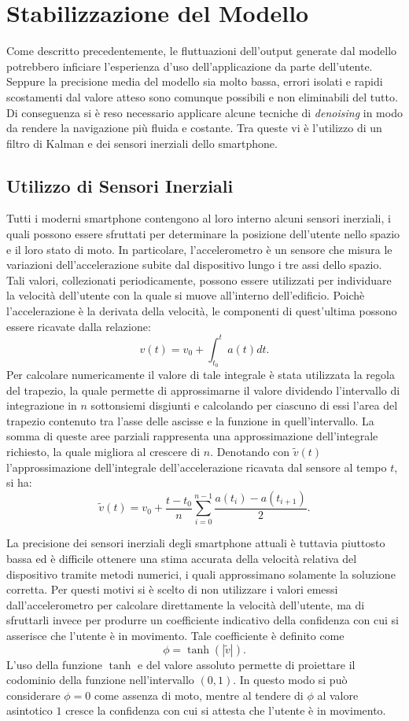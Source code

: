 \section{Stabilizzazione del Modello}
Come descritto precedentemente, le fluttuazioni dell'output generate dal
modello potrebbero inficiare l'esperienza d'uso dell'applicazione da parte
dell'utente. Seppure la precisione media del modello sia molto bassa, errori
isolati e rapidi scostamenti dal valore atteso sono comunque possibili e non
eliminabili del tutto. Di conseguenza si è reso necessario applicare alcune
tecniche di \emph{denoising} in modo da rendere la navigazione più fluida e
costante. Tra queste vi è l'utilizzo di un filtro di Kalman e dei sensori
inerziali dello smartphone.
\subsection{Utilizzo di Sensori Inerziali}
Tutti i moderni smartphone contengono al loro interno alcuni sensori inerziali,
i quali possono essere sfruttati per determinare la posizione dell'utente nello
spazio e il loro stato di moto. In particolare, l'accelerometro è un sensore
che misura le variazioni dell'accelerazione subite dal dispositivo lungo i tre
assi dello spazio. Tali valori, collezionati periodicamente, possono essere
utilizzati per individuare la velocità dell'utente con la quale si muove
all'interno dell'edificio. Poichè l'accelerazione è la derivata della velocità,
le componenti di quest'ultima possono essere ricavate dalla relazione:
\[v(t) = v_0 + \int_{t_0}^t{a(t) dt}. \]
Per calcolare numericamente il valore di tale integrale è stata utilizzata la
regola del trapezio, la quale permette di approssimarne il valore dividendo
l'intervallo di integrazione in \(n\) sottonsiemi disgiunti e calcolando per
ciascuno di essi l'area del trapezio contenuto tra l'asse delle ascisse e la
funzione in quell'intervallo. La somma di queste aree parziali rappresenta una
approssimazione dell'integrale richiesto, la quale migliora al crescere di
\(n\). Denotando con \(\tilde{v}(t)\) l'approssimazione dell'integrale
dell'accelerazione ricavata dal sensore al tempo \(t\), si ha:
\[ \tilde{v}(t) = 
  v_0 + \frac{t - t_0}{n} \sum_{i=0}^{n-1} {\frac{a(t_i) - a(t_{i+1})}{2}}. \]

La precisione dei sensori inerziali degli smartphone attuali è tuttavia
piuttosto bassa ed è difficile ottenere una stima accurata della velocità
relativa del dispositivo tramite metodi numerici, i quali approssimano
solamente la soluzione corretta. Per questi motivi si è scelto di non
utilizzare i valori emessi dall'accelerometro per calcolare direttamente la
velocità dell'utente, ma di sfruttarli invece per produrre un coefficiente
indicativo della confidenza con cui si asserisce che l'utente è in movimento.
Tale coefficiente è definito come
\[ \phi = \tanh(|\tilde{v}|). \]
L'uso della funzione \(\tanh\) e del valore assoluto permette di proiettare il
codominio della funzione nell'intervallo \( (0,1) \). In questo modo
si può considerare \(\phi = 0\) come assenza di moto, mentre al tendere di
\(\phi\) al valore asintotico \(1\) cresce la confidenza con cui si attesta
che l'utente è in movimento.

